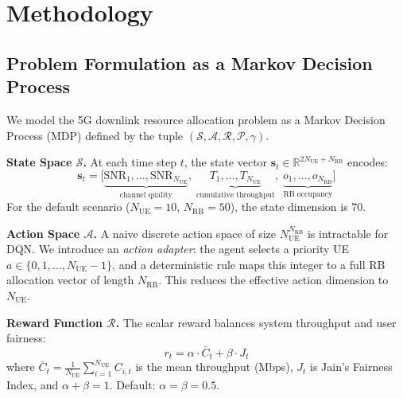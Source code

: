 
\section{Methodology}

\subsection{Problem Formulation as a Markov Decision Process}

We model the 5G downlink resource allocation problem as a Markov Decision
Process (MDP) defined by the tuple $(\mathcal{S}, \mathcal{A}, \mathcal{R},
\mathcal{P}, \gamma)$.

\textbf{State Space $\mathcal{S}$.}
At each time step $t$, the state vector $\mathbf{s}_t \in \mathbb{R}^{2N_{\text{UE}} + N_{\text{RB}}}$ encodes:
\begin{equation}
    \mathbf{s}_t = \bigl[\underbrace{\text{SNR}_1, \ldots, \text{SNR}_{N_{\text{UE}}}}_{\text{channel quality}},\;
                         \underbrace{T_1, \ldots, T_{N_{\text{UE}}}}_{\text{cumulative throughput}},\;
                         \underbrace{o_1, \ldots, o_{N_{\text{RB}}}}_{\text{RB occupancy}}\bigr]
\end{equation}
For the default scenario ($N_{\text{UE}}=10$, $N_{\text{RB}}=50$), the state dimension is 70.

\textbf{Action Space $\mathcal{A}$.}
A naive discrete action space of size $N_{\text{UE}}^{N_{\text{RB}}}$ is
intractable for DQN. We introduce an \emph{action adapter}: the agent selects a
priority UE $a \in \{0, 1, \ldots, N_{\text{UE}}-1\}$, and a deterministic
rule maps this integer to a full RB allocation vector of length $N_{\text{RB}}$.
This reduces the effective action dimension to $N_{\text{UE}}$.

\textbf{Reward Function $\mathcal{R}$.}
The scalar reward balances system throughput and user fairness:
\begin{equation}
    r_t = \alpha \cdot \bar{C}_t + \beta \cdot J_t
    \label{eq:reward}
\end{equation}
where $\bar{C}_t = \frac{1}{N_{\text{UE}}}\sum_{i=1}^{N_{\text{UE}}} C_{i,t}$
is the mean throughput (Mbps), $J_t$ is Jain's Fairness Index, and
$\alpha + \beta = 1$. Default: $\alpha = \beta = 0.5$.

